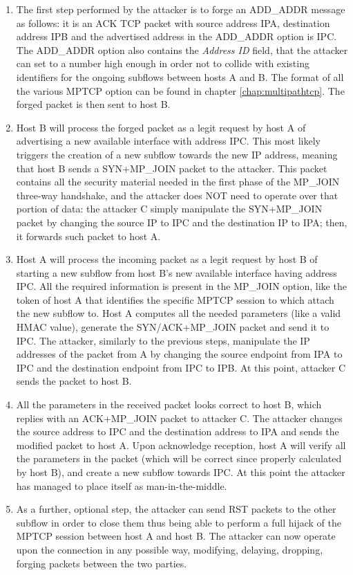 \begin{enumerate}  
\item  The first step performed by the attacker is to forge an ADD\_ADDR message as follows: it is an ACK TCP packet with source address IPA, destination address IPB and the advertised address in the ADD\_ADDR option is IPC. The ADD\_ADDR option also contains the \textit{Address ID} field, that the attacker can set to a number high enough in order not to collide with existing identifiers for the ongoing subflows between hosts A and B. The format of all the various MPTCP option can be found in chapter \ref{chap:multipathtcp}.
The forged packet is then sent to host B.

\item Host B will process the forged packet as a legit request by host A of advertising a new available interface with address IPC. This most likely triggers the creation of a new subflow towards the new IP address, meaning that host B sends a SYN+MP\_JOIN packet to the attacker. This packet contains all the security material needed in the first phase of the MP\_JOIN three-way handshake, and the attacker does NOT need to operate over that portion of data: the attacker C simply manipulate the SYN+MP\_JOIN packet by changing the source IP to IPC and the destination IP to IPA; then, it forwards such packet to host A.

\item Host A will process the incoming packet as a legit request by host B of starting a new subflow from host B's new available interface having address IPC. All the required information is present in the MP\_JOIN option, like the token of host A that identifies the specific MPTCP session to which attach the new subflow to. Host A computes all the needed parameters (like a valid HMAC value), generate the SYN/ACK+MP\_JOIN packet and send it to IPC. The attacker, similarly to the previous steps, manipulate the IP addresses of the packet from A by changing the source endpoint from IPA to IPC and the destination endpoint from IPC to IPB. At this point, attacker C sends the packet to host B.

\item All the parameters in the received packet looks correct to host B, which replies with an ACK+MP\_JOIN packet to attacker C. The attacker changes the source address to IPC and the destination address to IPA and sends the modified packet to host A. Upon acknowledge reception, host A will verify all the parameters in the packet (which will be correct since properly calculated by host B), and create a new subflow towards IPC. At this point the attacker has managed to place itself as man-in-the-middle.

\item As a further, optional step, the attacker can send RST packets to the other subflow in order to close them thus being able to perform a full hijack of the MPTCP session between host A and host B. The attacker can now operate upon the connection in any possible way, modifying, delaying, dropping, forging packets between the two parties.
\end{enumerate}

